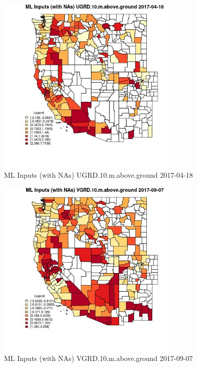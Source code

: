 \begin{figure} 
\centering  
\includegraphics[width=0.77\textwidth]{Code_Outputs/Report_ML_input_PM25_Step4_part_e_de_duplicated_aves_compiled_2019-05-21wNAs_CountyUGRD10mabovegroundMean2017-04-18.jpg} 
\caption{\label{fig:Report_ML_input_PM25_Step4_part_e_de_duplicated_aves_compiled_2019-05-21wNAsCountyUGRD10mabovegroundMean2017-04-18}ML Inputs (with NAs) UGRD.10.m.above.ground 2017-04-18} 
\end{figure} 
 

\begin{figure} 
\centering  
\includegraphics[width=0.77\textwidth]{Code_Outputs/Report_ML_input_PM25_Step4_part_e_de_duplicated_aves_compiled_2019-05-21wNAs_CountyVGRD10mabovegroundMean2017-09-07.jpg} 
\caption{\label{fig:Report_ML_input_PM25_Step4_part_e_de_duplicated_aves_compiled_2019-05-21wNAsCountyVGRD10mabovegroundMean2017-09-07}ML Inputs (with NAs) VGRD.10.m.above.ground 2017-09-07} 
\end{figure} 
 


